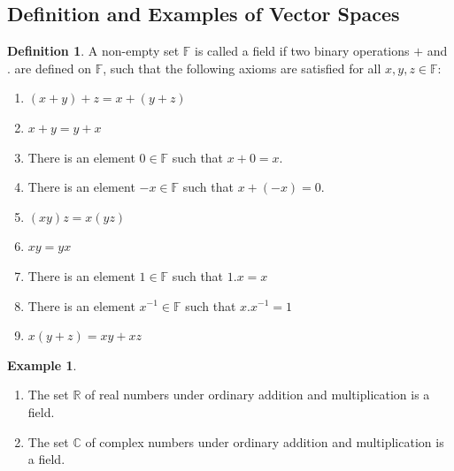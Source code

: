 \documentclass[11pt,a4paper]{article}
\theoremstyle{definition}
\newtheorem{defn}[thm]{Definition}
\newtheorem{exa}[thm]{Example}
\begin{document}
\subsection{Definition and Examples of Vector Spaces}
\begin{defn}
A non-empty set $\mathbb{F}$ is called a field if two binary operations $+$ and $.$ are defined on $\mathbb{F}$, such that the following axioms are satisfied for all $x,y,z\in \mathbb{F}$:
\begin{enumerate}
\item $(x+y)+z=x+(y+z)$
\item $x+y=y+x$
\item There is an element $0\in \mathbb{F}$ such that $x+0=x$.
\item There is an element $-x\in \mathbb{F}$ such that $x+(-x)=0$.
\item $(xy)z=x(yz)$
\item $xy=yx$
\item There is an element $1\in \mathbb{F}$ such that $1.x=x$
\item There is an element $x^{-1}\in \mathbb{F}$ such that $x.x^{-1}=1$
\item $x(y+z)=xy+xz$
\end{enumerate}
\end{defn}


\begin{exa}
\begin{enumerate}
\item The set $\mathbb{R}$ of real numbers under ordinary addition and multiplication is a field.
\item The set $\mathbb{C}$ of complex numbers under ordinary addition and multiplication is a field.
\end{enumerate}
\end{exa}
\end{document}
